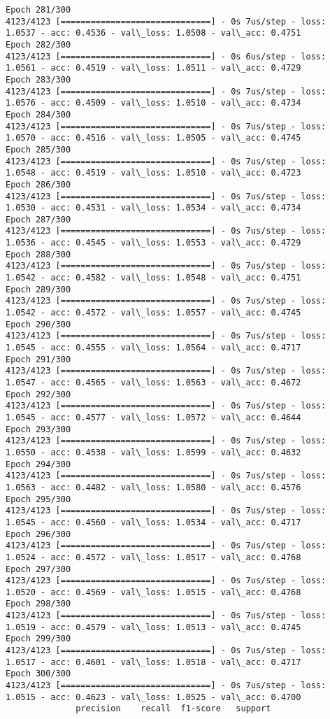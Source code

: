 \documentclass[11pt]{article}
\begin{document}
\begin{Verbatim}[commandchars=\\\{\}]
Epoch 281/300
4123/4123 [==============================] - 0s 7us/step - loss: 1.0537 - acc: 0.4536 - val\_loss: 1.0508 - val\_acc: 0.4751
Epoch 282/300
4123/4123 [==============================] - 0s 6us/step - loss: 1.0561 - acc: 0.4519 - val\_loss: 1.0511 - val\_acc: 0.4729
Epoch 283/300
4123/4123 [==============================] - 0s 7us/step - loss: 1.0576 - acc: 0.4509 - val\_loss: 1.0510 - val\_acc: 0.4734
Epoch 284/300
4123/4123 [==============================] - 0s 7us/step - loss: 1.0570 - acc: 0.4516 - val\_loss: 1.0505 - val\_acc: 0.4745
Epoch 285/300
4123/4123 [==============================] - 0s 7us/step - loss: 1.0548 - acc: 0.4519 - val\_loss: 1.0510 - val\_acc: 0.4723
Epoch 286/300
4123/4123 [==============================] - 0s 7us/step - loss: 1.0530 - acc: 0.4531 - val\_loss: 1.0534 - val\_acc: 0.4734
Epoch 287/300
4123/4123 [==============================] - 0s 7us/step - loss: 1.0536 - acc: 0.4545 - val\_loss: 1.0553 - val\_acc: 0.4729
Epoch 288/300
4123/4123 [==============================] - 0s 7us/step - loss: 1.0542 - acc: 0.4582 - val\_loss: 1.0548 - val\_acc: 0.4751
Epoch 289/300
4123/4123 [==============================] - 0s 7us/step - loss: 1.0542 - acc: 0.4572 - val\_loss: 1.0557 - val\_acc: 0.4745
Epoch 290/300
4123/4123 [==============================] - 0s 7us/step - loss: 1.0545 - acc: 0.4555 - val\_loss: 1.0564 - val\_acc: 0.4717
Epoch 291/300
4123/4123 [==============================] - 0s 7us/step - loss: 1.0547 - acc: 0.4565 - val\_loss: 1.0563 - val\_acc: 0.4672
Epoch 292/300
4123/4123 [==============================] - 0s 7us/step - loss: 1.0545 - acc: 0.4577 - val\_loss: 1.0572 - val\_acc: 0.4644
Epoch 293/300
4123/4123 [==============================] - 0s 7us/step - loss: 1.0550 - acc: 0.4538 - val\_loss: 1.0599 - val\_acc: 0.4632
Epoch 294/300
4123/4123 [==============================] - 0s 7us/step - loss: 1.0563 - acc: 0.4482 - val\_loss: 1.0580 - val\_acc: 0.4576
Epoch 295/300
4123/4123 [==============================] - 0s 7us/step - loss: 1.0545 - acc: 0.4560 - val\_loss: 1.0534 - val\_acc: 0.4717
Epoch 296/300
4123/4123 [==============================] - 0s 7us/step - loss: 1.0524 - acc: 0.4572 - val\_loss: 1.0517 - val\_acc: 0.4768
Epoch 297/300
4123/4123 [==============================] - 0s 7us/step - loss: 1.0520 - acc: 0.4569 - val\_loss: 1.0515 - val\_acc: 0.4768
Epoch 298/300
4123/4123 [==============================] - 0s 7us/step - loss: 1.0519 - acc: 0.4579 - val\_loss: 1.0513 - val\_acc: 0.4745
Epoch 299/300
4123/4123 [==============================] - 0s 7us/step - loss: 1.0517 - acc: 0.4601 - val\_loss: 1.0518 - val\_acc: 0.4717
Epoch 300/300
4123/4123 [==============================] - 0s 7us/step - loss: 1.0515 - acc: 0.4623 - val\_loss: 1.0525 - val\_acc: 0.4700
              precision    recall  f1-score   support


\end{Verbatim}
\end{document}
